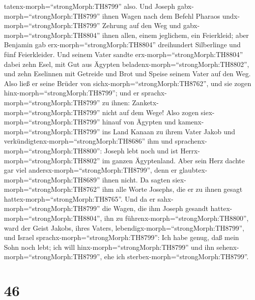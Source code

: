 tatenx-morph=``strongMorph:TH8799'' also. Und Joseph
gabx-morph=``strongMorph:TH8799'' ihnen Wagen nach dem Befehl Pharaos
undx-morph=``strongMorph:TH8799'' Zehrung auf den Weg  und
gabx-morph=``strongMorph:TH8804'' ihnen allen, einem jeglichem, ein
Feierkleid; aber Benjamin gab erx-morph=``strongMorph:TH8804''
dreihundert Silberlinge und fünf Feierkleider.  Und seinem
Vater sandte erx-morph=``strongMorph:TH8804'' dabei zehn Esel, mit Gut
aus Ägypten beladenx-morph=``strongMorph:TH8802'', und zehn Eselinnen
mit Getreide und Brot und Speise seinem Vater auf den Weg. 
Also ließ er seine Brüder von sichx-morph=``strongMorph:TH8762'', und
sie zogen hinx-morph=``strongMorph:TH8799''; und er
sprachx-morph=``strongMorph:TH8799'' zu ihnen:
Zanketx-morph=``strongMorph:TH8799'' nicht auf dem Wege! 
Also zogen siex-morph=``strongMorph:TH8799'' hinauf von Ägypten und
kamenx-morph=``strongMorph:TH8799'' ins Land Kanaan zu ihrem Vater Jakob
 und verkündigtenx-morph=``strongMorph:TH8686'' ihm und
sprachenx-morph=``strongMorph:TH8800'': Joseph lebt noch und ist
Herrx-morph=``strongMorph:TH8802'' im ganzen Ägyptenland. Aber sein Herz
dachte gar viel andersx-morph=``strongMorph:TH8799'', denn er
glaubtex-morph=``strongMorph:TH8689'' ihnen nicht.  Da
sagten siex-morph=``strongMorph:TH8762'' ihm alle Worte Josephs, die er
zu ihnen gesagt hattex-morph=``strongMorph:TH8765''. Und da er
sahx-morph=``strongMorph:TH8799'' die Wagen, die ihm Joseph gesandt
hattex-morph=``strongMorph:TH8804'', ihn zu
führenx-morph=``strongMorph:TH8800'', ward der Geist Jakobs, ihres
Vaters, lebendigx-morph=``strongMorph:TH8799'',  und Israel
sprachx-morph=``strongMorph:TH8799'': Ich habe genug, daß mein Sohn noch
lebt; ich will hinx-morph=``strongMorph:TH8799'' und ihn
sehenx-morph=``strongMorph:TH8799'', ehe ich
sterbex-morph=``strongMorph:TH8799''.

\hypertarget{section-45}{%
\section{46}\label{section-45}}


